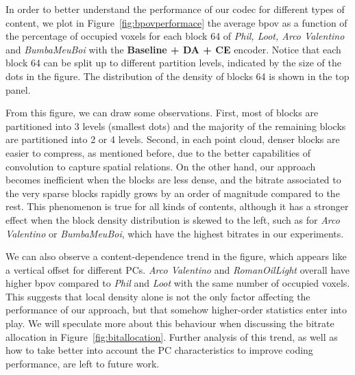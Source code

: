 In order to better understand the performance of our codec for different types of content, we plot in Figure~\ref{fig:bpovperformace} the average bpov as a function of the percentage of occupied voxels for each block 64 of \textit{Phil, Loot, Arco Valentino} and \textit{BumbaMeuBoi} with the \textbf{Baseline + DA + CE} encoder. Notice that each block 64 can be split up to different partition levels, indicated by the size of the dots in the figure. The distribution of the density of blocks 64 is shown in the top panel. 

From this figure, we can draw some observations.
First, most of blocks are partitioned into 3 levels (smallest dots) and the majority of the remaining blocks are partitioned into 2 or 4 levels. Second, in each point cloud, denser blocks are easier to compress, as mentioned before, due to the better capabilities of convolution to capture spatial relations. On the other hand, our approach becomes inefficient when the blocks are less dense, and the bitrate associated to the very sparse blocks rapidly grows by an order of magnitude compared to the rest. This phenomenon is true for all kinds of contents, although it has a stronger effect when the block density distribution is skewed to the left, such as for \textit{Arco Valentino} or \textit{BumbaMeuBoi}, which have the highest bitrates in our experiments. 
\par We can also observe a content-dependence trend in the figure, which appears like a vertical offset for different PCs. \textit{Arco Valentino} and \textit{RomanOilLight} overall have higher bpov compared to \textit{Phil} and \textit{Loot} with the same number of occupied voxels. This suggests that local density alone is not the only factor affecting the performance of our approach, but that somehow higher-order statistics enter into play. We will speculate more about this behaviour when discussing the bitrate allocation in Figure~\ref{fig:bitallocation}. Further analysis of this trend, as well as how to take better into account the PC characteristics to improve coding performance, are left to future work.


